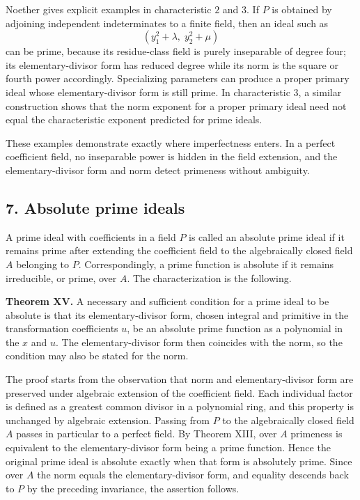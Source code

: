 \documentclass[12pt]{article}
\begin{document}
Noether gives explicit examples in characteristic $2$ and $3$. If $P$ is obtained by adjoining independent indeterminates to a finite field, then an ideal such as
\[
  (y_1^2+\lambda,\; y_2^2+\mu)
\]
can be prime, because its residue-class field is purely inseparable of degree four; its elementary-divisor form has reduced degree while its norm is the square or fourth power accordingly. Specializing parameters can produce a proper primary ideal whose elementary-divisor form is still prime. In characteristic $3$, a similar construction shows that the norm exponent for a proper primary ideal need not equal the characteristic exponent predicted for prime ideals.

These examples demonstrate exactly where imperfectness enters. In a perfect coefficient field, no inseparable power is hidden in the field extension, and the elementary-divisor form and norm detect primeness without ambiguity.

\subsection{7. Absolute prime ideals}

A prime ideal with coefficients in a field $P$ is called an absolute prime ideal if it remains prime after extending the coefficient field to the algebraically closed field $A$ belonging to $P$. Correspondingly, a prime function is absolute if it remains irreducible, or prime, over $A$. The characterization is the following.

\textbf{Theorem XV.} A necessary and sufficient condition for a prime ideal to be absolute is that its elementary-divisor form, chosen integral and primitive in the transformation coefficients $u$, be an absolute prime function as a polynomial in the $x$ and $u$. The elementary-divisor form then coincides with the norm, so the condition may also be stated for the norm.

The proof starts from the observation that norm and elementary-divisor form are preserved under algebraic extension of the coefficient field. Each individual factor is defined as a greatest common divisor in a polynomial ring, and this property is unchanged by algebraic extension. Passing from $P$ to the algebraically closed field $A$ passes in particular to a perfect field. By Theorem XIII, over $A$ primeness is equivalent to the elementary-divisor form being a prime function. Hence the original prime ideal is absolute exactly when that form is absolutely prime. Since over $A$ the norm equals the elementary-divisor form, and equality descends back to $P$ by the preceding invariance, the assertion follows.
\end{document}
